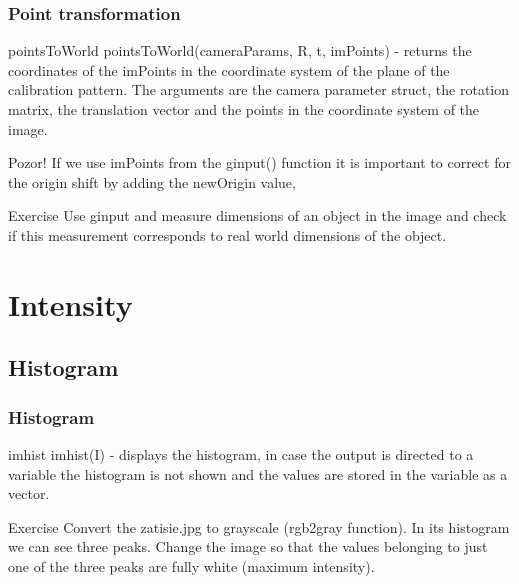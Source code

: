 \documentclass{beamer}
\begin{document}
\begin{frame}
\frametitle{Point transformation}
\begin{block}{pointsToWorld}
pointsToWorld(cameraParams, R, t, imPoints) - returns the coordinates of the imPoints in the coordinate system of the plane of the calibration pattern. The arguments are the camera parameter struct, the rotation matrix, the translation vector and the points in the coordinate system of the image. 
\end{block}

\begin{alertblock}{Pozor!}
If we use imPoints from the ginput() function it is important to correct for the origin shift by adding the newOrigin value,
\end{alertblock}

\begin{block}{Exercise}
Use ginput and measure dimensions of an object in the image and check if this measurement corresponds to real world dimensions of the object.
\end{block}
\end{frame}

\section{Intensity}
\subsection{Histogram}
\begin{frame}
\frametitle{Histogram}
\begin{block}{imhist}
imhist(I) - displays the histogram, in case the output is directed to a variable the histogram is not shown and the values are stored in the variable as a vector.
\end{block}

\begin{block}{Exercise}
Convert the zatisie.jpg to grayscale (rgb2gray function). In its histogram we can see three peaks. Change the image so that the values belonging to just one of the three peaks are fully white (maximum intensity).
\end{block}
\end{frame}
\end{document}
